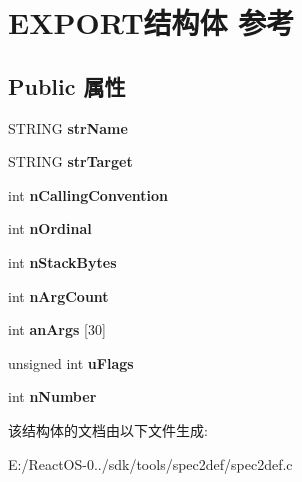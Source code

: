\hypertarget{struct_e_x_p_o_r_t}{}\section{E\+X\+P\+O\+R\+T结构体 参考}
\label{struct_e_x_p_o_r_t}
\subsection*{Public 属性}
\begin{DoxyCompactItemize}
\item 
\mbox{\label{struct_e_x_p_o_r_t_a367f53ca469d681d09c53384c7a0a85d}} 
S\+T\+R\+I\+NG {\bfseries str\+Name}
\item 
\mbox{\label{struct_e_x_p_o_r_t_a541994bf64d8f4d2f1442ba6dc10bb89}} 
S\+T\+R\+I\+NG {\bfseries str\+Target}
\item 
\mbox{\label{struct_e_x_p_o_r_t_a4f26badde42211fe2e4b097021574272}} 
int {\bfseries n\+Calling\+Convention}
\item 
\mbox{\label{struct_e_x_p_o_r_t_a843d6253ee4a9dea9cddd49d8ce8c162}} 
int {\bfseries n\+Ordinal}
\item 
\mbox{\label{struct_e_x_p_o_r_t_a7505d99fc4957580a20d4052008a90a7}} 
int {\bfseries n\+Stack\+Bytes}
\item 
\mbox{\label{struct_e_x_p_o_r_t_aa9d1bc157d1fd87fdc048d5466cc1159}} 
int {\bfseries n\+Arg\+Count}
\item 
\mbox{\label{struct_e_x_p_o_r_t_aa54f11f53fd8718d462be976ec6a22f3}} 
int {\bfseries an\+Args} \mbox{[}30\mbox{]}
\item 
\mbox{\label{struct_e_x_p_o_r_t_ab547b4eb9aefe902d9a75f2bff026c0c}} 
unsigned int {\bfseries u\+Flags}
\item 
\mbox{\label{struct_e_x_p_o_r_t_a1529943bb8b9c28126aac9f41983ff70}} 
int {\bfseries n\+Number}
\end{DoxyCompactItemize}


该结构体的文档由以下文件生成\+:\begin{DoxyCompactItemize}
\item 
E\+:/\+React\+O\+S-\/0../sdk/tools/spec2def/spec2def.\+c\end{DoxyCompactItemize}
